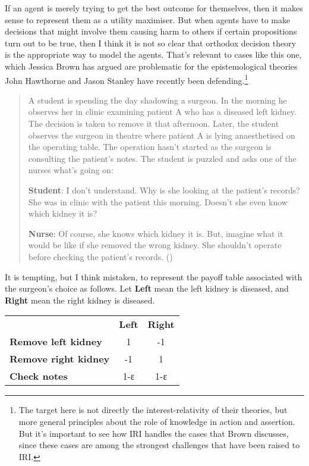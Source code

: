 \documentclass[
  10pt,
  letterpaper,
  DIV=11,
  numbers=noendperiod,
  twoside]{scrartcl}
\begin{document}
If an agent is merely trying to get the best outcome for themselves,
then it makes sense to represent them as a utility maximiser. But when
agents have to make decisions that might involve them causing harm to
others if certain propositions turn out to be true, then I think it is
not so clear that orthodox decision theory is the appropriate way to
model the agents. That's relevant to cases like this one, which Jessica
Brown has argued are problematic for the epistemological theories John
Hawthorne and Jason Stanley have recently been defending.\footnote{The
  target here is not directly the interest-relativity of their theories,
  but more general principles about the role of knowledge in action and
  assertion. But it's important to see how IRI handles the cases that
  Brown discusses, since these cases are among the strongest challenges
  that have been raised to IRI.}

\begin{quote}
A student is spending the day shadowing a surgeon. In the morning he
observes her in clinic examining patient A who has a diseased left
kidney. The decision is taken to remove it that afternoon. Later, the
student observes the surgeon in theatre where patient A is lying
anaesthetised on the operating table. The operation hasn't started as
the surgeon is consulting the patient's notes. The student is puzzled
and asks one of the nurses what's going on:

\textbf{Student}: I don't understand. Why is she looking at the
patient's records? She was in clinic with the patient this morning.
Doesn't she even know which kidney it is?

\textbf{Nurse}: Of course, she knows which kidney it is. But, imagine
what it would be like if she removed the wrong kidney. She shouldn't
operate before checking the patient's records.
()
\end{quote}

It is tempting, but I think mistaken, to represent the payoff table
associated with the surgeon's choice as follows. Let \textbf{Left} mean
the left kidney is diseased, and \textbf{Right} mean the right kidney is
diseased.

\begin{longtable}[]{@{}lcc@{}}
\toprule\noalign{}
\endhead
\bottomrule\noalign{}
\endlastfoot
& \textbf{Left} & \textbf{Right} \\
\textbf{Remove left kidney} & 1 & -1 \\
\textbf{Remove right kidney} & -1 & 1 \\
\textbf{Check notes} & 1-ε & 1-ε \\
\end{longtable}
\end{document}
